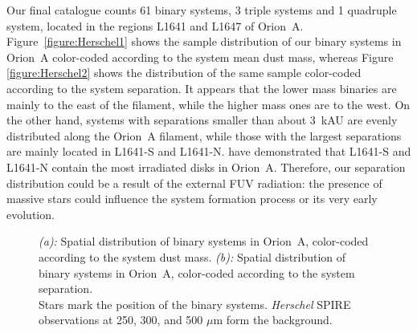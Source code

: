 \documentclass{aa}
\begin{document}
Our final catalogue counts 61 binary systems, 3 triple systems and 1 quadruple system, located in the regions L1641 and L1647 of Orion~A. Figure~\ref{figure:Herschel1} shows the sample distribution of our binary systems in Orion~A color-coded according to the system mean dust mass, whereas Figure \ref{figure:Herschel2} shows the distribution of the same sample color-coded according to the system separation. It appears that the lower mass binaries are mainly to the east of the filament, while the higher mass ones are to the west. On the other hand, systems with separations smaller than about 3~kAU are evenly distributed along the Orion~A filament, while those with the largest separations are mainly located in L1641-S and L1641-N. \cite{VanTerwisga23} have demonstrated that L1641-S and L1641-N contain the most irradiated disks in Orion~A. Therefore, our separation distribution could be a result of the external FUV radiation: the presence of massive stars could influence the system formation process or its very early evolution.

\begin{figure}
\centering
{}
     \caption{\textit{(a):} Spatial distribution of binary systems in Orion~A, color-coded according to the system dust mass. \textit{(b):} Spatial distribution of binary systems in Orion~A, color-coded according to the system separation. \\
     Stars mark the position of the binary systems. \textit{Herschel} SPIRE observations at 250, 300, and 500 $\mu$m \citep{Soler19} form the background.}
\end{figure}
\end{document}
